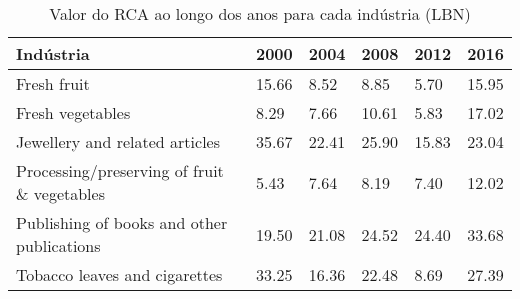\begin{table}
\centering
\caption{Valor do RCA ao longo dos anos para cada indústria (LBN)}
\begin{tabular}{p{6cm}p{1.5cm}p{1.5cm}p{1.5cm}p{1.5cm}p{1.5cm}}
\toprule
                                  Indústria &  2000 &  2004 &  2008 &  2012 &  2016 \\
\midrule
                                Fresh fruit & 15.66 &  8.52 &  8.85 &  5.70 & 15.95 \\
                           Fresh vegetables &  8.29 &  7.66 & 10.61 &  5.83 & 17.02 \\
             Jewellery and related articles & 35.67 & 22.41 & 25.90 & 15.83 & 23.04 \\
Processing/preserving of fruit \& vegetables &  5.43 &  7.64 &  8.19 &  7.40 & 12.02 \\
 Publishing of books and other publications & 19.50 & 21.08 & 24.52 & 24.40 & 33.68 \\
              Tobacco leaves and cigarettes & 33.25 & 16.36 & 22.48 &  8.69 & 27.39 \\
\bottomrule
\end{tabular}
\end{table}
